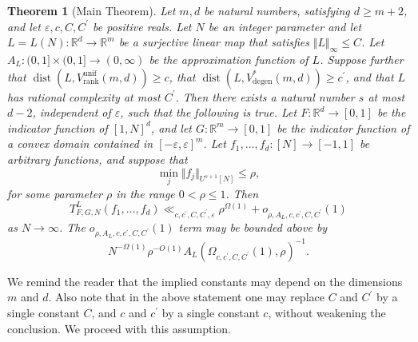\documentclass[12pt,a4paper,twoside,reqno]{amsart}
\newtheorem{Theorem}{Theorem}
\newcommand{\degen}{\operatorname{degen}}
\newcommand{\rank}{\operatorname{rank}}
\newcommand{\unif}{\operatorname{unif}}
\numberwithin{equation}{section}
\begin{document}
\begin{Theorem}[Main Theorem]
\label{Main Theorem chapter 3}
Let $m,d$ be natural numbers, satisfying $d\geqslant m+2$, and let $\varepsilon , c,  C, C^\prime$ be positive reals. Let $N$ be an integer parameter and let $L = L(N):\mathbb{R}^d \longrightarrow \mathbb{R}^m$ be a surjective linear map that satisfies $\Vert L\Vert_\infty\leqslant C$. Let $A_L:(0,1]\times (0,1]\longrightarrow (0,\infty)$ be the approximation function of $L$. Suppose further that $\operatorname{dist}(L,V_{\rank}^{\unif}(m,d)) \geqslant c$, that $\operatorname{dist}(L,V^*_{\degen}(m,d))\geqslant c^\prime$, and that $L$ has rational complexity at most $C^\prime$. Then there exists a natural number $s$ at most $d-2$, independent of $\varepsilon$, such that the following is true. Let $F:\mathbb{R}^d\longrightarrow [0,1]$ be the indicator function of $[1,N]^d$, and let $G:\mathbb{R}^m\longrightarrow [0,1]$ be the indicator function of a convex domain contained in $[-\varepsilon, \varepsilon]^m$. Let $f_1,\dots,f_d:[N]\longrightarrow [-1,1]$ be arbitrary functions, and suppose that \[ \min_j \Vert f_j\Vert_{U^{s+1}[N]} \leqslant \rho,\] for some parameter $\rho$ in the range $0<\rho \leqslant 1$. Then 
\begin{equation}
\label{main equation chapter 3 theorem}
T^{L}_{F,G,N}(f_1,\dots,f_{d})\ll_{c,c^\prime,C,C^\prime,\varepsilon} \rho^{\Omega(1)} + o_{\rho,A_L,c,c^\prime,C,C^\prime}(1)
\end{equation} as $N\rightarrow \infty$.  The $o_{\rho,A_L,c,c^\prime,C,C^\prime}(1)$ term may be bounded above by \[ N^{-\Omega(1)}\rho^{-O(1)} A_L(\Omega_{c,c^\prime,C,C^{\prime}}(1),\rho)^{-1}.\] 
\end{Theorem}
\noindent We remind the reader that the implied constants may depend on the dimensions $m$ and $d$. Also note that in the above statement one may replace $C$ and $C^\prime$ by a single constant $C$, and $c$ and $c^\prime$ by a single constant $c$, without weakening the conclusion. We proceed with this assumption. \\
\end{document}
